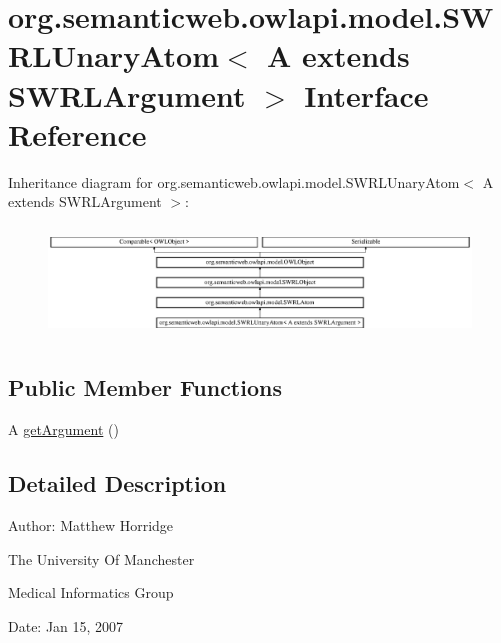 \hypertarget{interfaceorg_1_1semanticweb_1_1owlapi_1_1model_1_1_s_w_r_l_unary_atom_3_01_a_01extends_01_s_w_r_l_argument_01_4}{\section{org.\-semanticweb.\-owlapi.\-model.\-S\-W\-R\-L\-Unary\-Atom$<$ A extends S\-W\-R\-L\-Argument $>$ Interface Reference}
\label{interfaceorg_1_1semanticweb_1_1owlapi_1_1model_1_1_s_w_r_l_unary_atom_3_01_a_01extends_01_s_w_r_l_argument_01_4}
}
Inheritance diagram for org.\-semanticweb.\-owlapi.\-model.\-S\-W\-R\-L\-Unary\-Atom$<$ A extends S\-W\-R\-L\-Argument $>$\-:\begin{figure}[H]
\begin{center}
\leavevmode
\includegraphics[height=3.004292cm]{interfaceorg_1_1semanticweb_1_1owlapi_1_1model_1_1_s_w_r_l_unary_atom_3_01_a_01extends_01_s_w_r_l_argument_01_4}
\end{center}
\end{figure}
\subsection*{Public Member Functions}
\begin{DoxyCompactItemize}
\item 
A \hyperlink{interfaceorg_1_1semanticweb_1_1owlapi_1_1model_1_1_s_w_r_l_unary_atom_3_01_a_01extends_01_s_w_r_l_argument_01_4_abdf79dbf968df8046d77d2ffff31e589}{get\-Argument} ()
\end{DoxyCompactItemize}


\subsection{Detailed Description}
Author\-: Matthew Horridge\par
 The University Of Manchester\par
 Medical Informatics Group\par
 Date\-: Jan 15, 2007\par
\par
 

